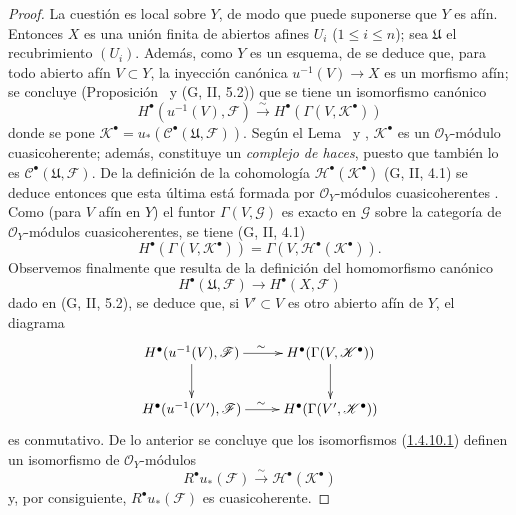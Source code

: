 \begin{proof}
La cuestión es local sobre $Y$, de modo que puede suponerse que $Y$ es afín.
Entonces $X$ es una unión finita de abiertos afines $U_i$ ($1\leq i\leq n$); sea $\mathfrak U$ el recubrimiento $(U_i)$.
Además, como $Y$ es un esquema, de  se deduce que, para todo abierto afín $V\subset Y$, la inyección canónica $u^{-1}(V)\to X$ es un morfismo afín; se concluye (Proposición~ y (G, II, 5.2)) que se tiene un isomorfismo canónico
\begin{equation}
\label{III.1.4.10.1-fr}
\tag{1.4.10.1}
H^\bullet(u^{-1}(V),\mathcal F)
\xrightarrow{\sim}H^\bullet(\Gamma(V,\mathcal K^\bullet))
\end{equation}
donde se pone $\mathcal K^\bullet=u_*(\mathcal C^\bullet(\mathfrak U,\mathcal F))$.
Según el Lema~ y , $\mathcal K^\bullet$ es un $\mathcal O_Y$-módulo cuasicoherente; además, constituye un \emph{complejo de haces}, puesto que también lo es $\mathcal C^\bullet(\mathfrak U,\mathcal F)$.
De la definición de la cohomología $\mathcal H^\bullet(\mathcal K^\bullet)$ (G, II, 4.1) se deduce entonces que esta última está formada por $\mathcal O_Y$-módulos cuasicoherentes .
Como (para $V$ afín en $Y$) el funtor $\Gamma(V,\mathcal G)$ es exacto en $\mathcal G$ sobre la categoría de $\mathcal O_Y$-módulos cuasicoherentes, se tiene (G, II, 4.1)
\begin{equation}
\label{III.1.4.10.2-fr}
\tag{1.4.10.2}
H^\bullet(\Gamma(V,\mathcal K^\bullet))
=\Gamma(V,\mathcal H^\bullet(\mathcal K^\bullet)).
\end{equation}
Observemos finalmente que resulta de la definición del homomorfismo canónico \[
H^\bullet(\mathfrak U,\mathcal F)\longrightarrow H^\bullet(X,\mathcal F)
\]
dado en (G, II, 5.2), se deduce que, si $V'\subset V$ es otro abierto afín de $Y$, el
diagrama
\[
\xymatrix{
H^\bullet(u^{-1}(V),\mathcal F)\ar[r]^{\sim}\ar[d]
&H^\bullet(\Gamma(V,\mathcal K^\bullet))\ar[d]\\
H^\bullet(u^{-1}(V'),\mathcal F)\ar[r]^{\sim}
&H^\bullet(\Gamma(V',\mathcal K^\bullet))
}
\]
es conmutativo.
De lo anterior se concluye que los isomorfismos (\hyperref[III.1.4.10.1]{1.4.10.1}) definen un isomorfismo de $\mathcal O_Y$-módulos
\begin{equation}
\label{III.1.4.10.3-fr}
\tag{1.4.10.3}
R^\bullet u_*(\mathcal F)
\xrightarrow{\sim}\mathcal H^\bullet(\mathcal K^\bullet)
\end{equation}
y, por consiguiente, $R^\bullet u_*(\mathcal F)$ es cuasicoherente.
\end{proof}

